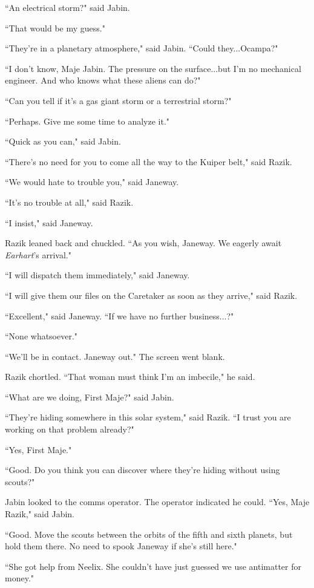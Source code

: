 \documentclass[twoside,letterpaper,12pt]{memoir}
\begin{document}
``An electrical storm?" said Jabin.

``That would be my guess."

``They're in a planetary atmosphere," said Jabin. ``Could they...Ocampa?"

``I don't know, Maje Jabin. The pressure on the surface...but I'm no mechanical engineer. And who knows what these aliens can do?"

``Can you tell if it's a gas giant storm or a terrestrial storm?"

``Perhaps. Give me some time to analyze it."

``Quick as you can," said Jabin.

``There's no need for you to come all the way to the Kuiper belt," said Razik.

``We would hate to trouble you," said Janeway.

``It's no trouble at all," said Razik.

``I insist," said Janeway.

Razik leaned back and chuckled. ``As you wish, Janeway. We eagerly await \textit{Earhart}'s arrival."

``I will dispatch them immediately," said Janeway.

``I will give them our files on the Caretaker as soon as they arrive," said Razik.

``Excellent," said Janeway. ``If we have no further business...?"

``None whatsoever."

``We'll be in contact. Janeway out." The screen went blank.

Razik chortled. ``That woman must think I’m an imbecile," he said.

``What are we doing, First Maje?" said Jabin.

``They're hiding somewhere in this solar system," said Razik. ``I trust you are working on that problem already?"

``Yes, First Maje."

``Good. Do you think you can discover where they're hiding without using scouts?"

Jabin looked to the comms operator. The operator indicated he could. ``Yes, Maje Razik," said Jabin.

``Good. Move the scouts between the orbits of the fifth and sixth planets, but hold them there. No need to spook Janeway if she's still here."

``She got help from Neelix. She couldn't have just guessed we use antimatter for money."
\end{document}
